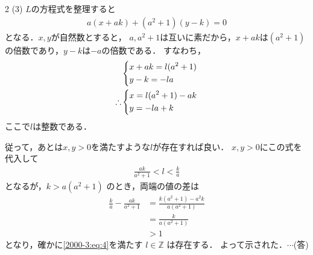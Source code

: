 \documentclass[../../../../main.tex]{subfiles}
\begin{document}
\begin{multicols}{2}
  \vspace{10pt}
  (3)
  $L$の方程式を整理すると
  \begin{align*}
    a(x+ak) + (a^2+1)(y-k) = 0
  \end{align*}
  となる．$x,y$が自然数とすると，
  $a, a^2+1$は互いに素だから，$x+ak$は$(a^2+1)$の倍数であり，$y-k$は$-a$の倍数である．
  すなわち，
  \begin{align*}
     & \begin{dcases}
         x + ak = l(a^2+1) \\
         y - k = -la
       \end{dcases} \\
    \therefore
     & \begin{dcases}
         x = l(a^2+1) -ak \\
         y = -la + k
       \end{dcases}
  \end{align*}
  ここで$l$は整数である．

  従って，あとは$x,y>0$を満たすような$l$が存在すれば良い．
  $x,y>0$にこの式を代入して
  \begin{align}
    \frac{ak}{a^2+1} < l < \frac{k}{a}  \label{2000-3:eq:4}
  \end{align}
  となるが，$k> a(a^2+1)$ のとき，両端の値の差は
  \begin{align*}
    \frac{k}{a} - \frac{ak}{a^2+1}
     & = \frac{k(a^2+1) - a^2k}{a(a^2+1)} \\
     & = \frac{k}{a(a^2+1)}               \\
     & > 1
  \end{align*}
  となり，確かに\cref{2000-3:eq:4}を満たす $l \in \mathbb{Z}$ は存在する．
  よって示された．$\cdots$(答)


  \newpage
\end{multicols}
\end{document}
